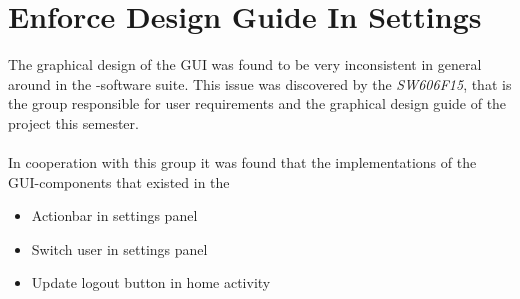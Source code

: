 \section{Enforce Design Guide In Settings}
\label{sec:enforce_design_guide_in_settings}

The graphical design of the GUI was found to be very inconsistent in general around in the \giraf-software suite. This issue was discovered by the \emph{SW606F15}, that is the group responsible for user requirements and the graphical design guide of the project this semester.
\\\\
In cooperation with this group it was found that the implementations of the GUI-components that existed in the 

\begin{itemize}
	\item Actionbar in settings panel
	\item Switch user in settings panel
	\item Update logout button in home activity
\end{itemize}